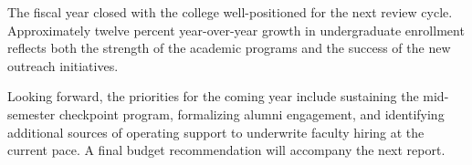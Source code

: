 The fiscal year closed with the college well-positioned for the next
review cycle. Approximately twelve percent year-over-year growth in
undergraduate enrollment reflects both the strength of the academic
programs and the success of the new outreach initiatives.



Looking forward, the priorities for the coming year include sustaining the
mid-semester checkpoint program, formalizing alumni engagement, and
identifying additional sources of operating support to underwrite
faculty hiring at the current pace. A final budget recommendation will
accompany the next report.
